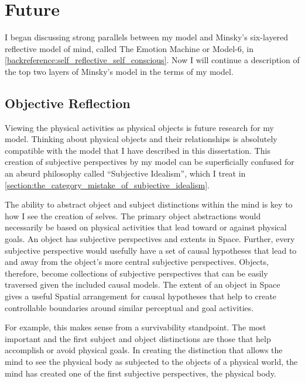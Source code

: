 \chapter{Future}\label{chapter:future}

\label{section:model_6_future_research}

I began discussing strong parallels between my model and Minsky's
six-layered reflective model of mind, called The Emotion Machine or
Model-6, in \autoref{backreference:self_reflective_self_conscious}.
Now I will continue a description of the top two layers of Minsky's
model in the terms of my model.

\section{Objective Reflection}
\label{section:objective_reflection}

Viewing the physical activities as physical objects is future research
for my model.  Thinking about physical objects and their relationships
is absolutely compatible with the model that I have described in this
dissertation.  This creation of subjective perspectives by my model
can be superficially confused for an absurd philosophy called
``Subjective Idealism'', which I treat in
\autoref{section:the_category_mistake_of_subjective_idealism}.

The ability to abstract object and subject distinctions within the
mind is key to how I see the creation of selves.  The primary object
abstractions would necessarily be based on physical activities that
lead toward or against physical goals.  An object has subjective
perspectives and extents in Space.  Further, every subjective
perspective would usefully have a set of causal hypotheses that lead
to and away from the object's more central subjective perspectives.
Objects, therefore, become collections of subjective perspectives that
can be easily traversed given the included causal models.  The extent
of an object in Space gives a useful Spatial arrangement for causal
hypotheses that help to create controllable boundaries around similar
perceptual and goal activities.

For example, this makes sense from a survivability standpoint.  The
most important and the first subject and object distinctions are those
that help accomplish or avoid physical goals.  In creating the
distinction that allows the mind to see the physical body as subjected
to the objects of a physical world, the mind has created one of the
first subjective perspectives, the physical body.

